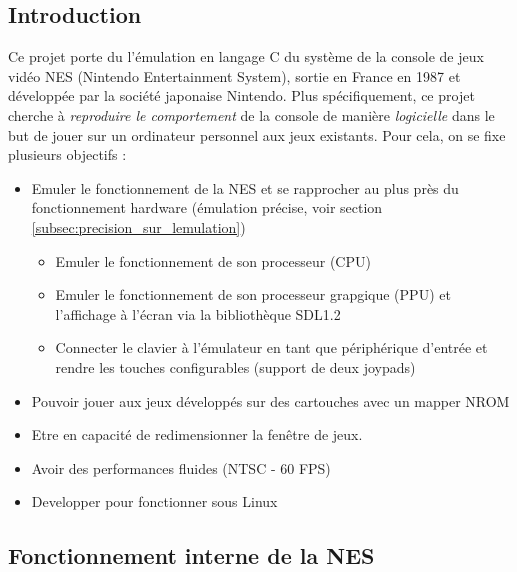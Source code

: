 \subsection{Introduction}

Ce projet porte du l'émulation en langage C du système de la console de jeux vidéo NES (Nintendo Entertainment System), sortie en France en 1987 et développée par la société japonaise Nintendo. Plus spécifiquement, ce projet cherche à \emph{reproduire le comportement} de la console de manière \emph{logicielle} dans le but de jouer sur un ordinateur personnel aux jeux existants. Pour cela, on se fixe plusieurs objectifs :
\begin{itemize}
  \item Emuler le fonctionnement de la NES et se rapprocher au plus près du fonctionnement hardware (émulation précise, voir section \ref{subsec:precision_sur_lemulation})
  \begin{itemize}
    \item Emuler le fonctionnement de son processeur (CPU)
    \item Emuler le fonctionnement de son processeur grapgique (PPU) et l'affichage à l'écran via la bibliothèque SDL1.2
    \item Connecter le clavier à l'émulateur en tant que périphérique d'entrée et rendre les touches configurables (support de deux joypads)
  \end{itemize}
  \item Pouvoir jouer aux jeux développés sur des cartouches avec un mapper NROM
  \item Etre en capacité de redimensionner la fenêtre de jeux.
  \item Avoir des performances fluides (NTSC - 60 FPS)
  \item Developper pour fonctionner sous Linux
\end{itemize}

\subsection{Fonctionnement interne de la NES}
\label{subsec:fonctionnement_interne_nes}

